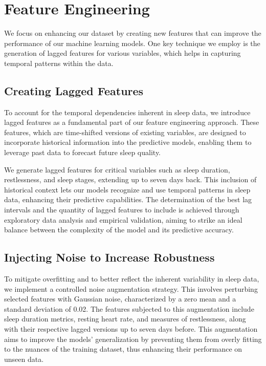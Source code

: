 \documentclass[10pt]{extarticle}
\begin{document}
\section{Feature Engineering}

We focus on enhancing our dataset by creating new features that can improve the performance of our machine learning models. One key technique we employ is the generation of lagged features for various variables, which helps in capturing temporal patterns within the data.

\subsection{Creating Lagged Features}

To account for the temporal dependencies inherent in sleep data, we introduce lagged features as a fundamental part of our feature engineering approach. These features, which are time-shifted versions of existing variables, are designed to incorporate historical information into the predictive models, enabling them to leverage past data to forecast future sleep quality.

We generate lagged features for critical variables such as sleep duration, restlessness, and sleep stages, extending up to seven days back. This inclusion of historical context lets our models recognize and use temporal patterns in sleep data, enhancing their predictive capabilities. The determination of the best lag intervals and the quantity of lagged features to include is achieved through exploratory data analysis and empirical validation, aiming to strike an ideal balance between the complexity of the model and its predictive accuracy.

\subsection{Injecting Noise to Increase Robustness}

To mitigate overfitting and to better reflect the inherent variability in sleep data, we implement a controlled noise augmentation strategy. This involves perturbing selected features with Gaussian noise, characterized by a zero mean and a standard deviation of 0.02. The features subjected to this augmentation include sleep duration metrics, resting heart rate, and measures of restlessness, along with their respective lagged versions up to seven days before. This augmentation aims to improve the models' generalization by preventing them from overly fitting to the nuances of the training dataset, thus enhancing their performance on unseen data.
\end{document}
